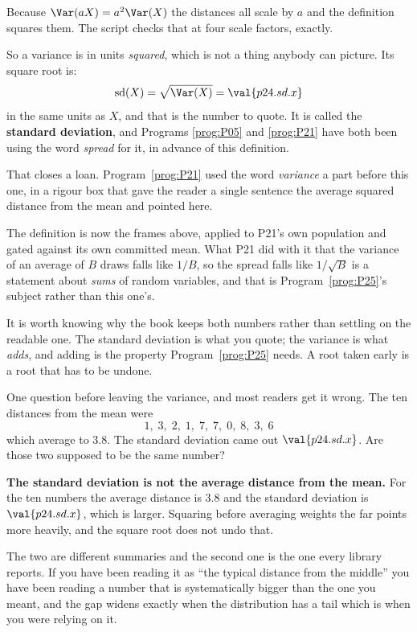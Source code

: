 \begin{fr}

Because $\Var(aX) = a^{2}\Var(X)$ \dash{} the distances all scale by $a$ and
the definition squares them. The script checks that at four scale factors,
exactly.

So a variance is in units \emph{squared}, which is not a thing anybody can
picture. Its square root is:
\[ \operatorname{sd}(X) = \sqrt{\Var(X)} = \val{p24.sd.x} \]
in the same units as $X$, and that is the number to quote. It is called the
\textbf{standard deviation}, and Programs \ref{prog:P05} and \ref{prog:P21}
have both been using the word \emph{spread} for it, in advance of this
definition.
\end{fr}

\begin{fr}
That closes a loan. Program~\ref{prog:P21} used the word \emph{variance} a
part before this one, in a rigour box that gave the reader a single sentence
\dash{} the average squared distance from the mean \dash{} and pointed here.

The definition is now the frames above, applied to P21's own population and
gated against its own committed mean. What P21 did with it \dash{} that the
variance of an average of $B$ draws falls like $1/B$, so the spread falls like
$1/\sqrt{B}$ \dash{} is a statement about \emph{sums} of random variables, and
that is Program~\ref{prog:P25}'s subject rather than this one's.

It is worth knowing why the book keeps both numbers rather than settling on the
readable one. The standard deviation is what you quote; the variance is what
\emph{adds}, and adding is the property Program~\ref{prog:P25} needs. A root
taken early is a root that has to be undone.

One question before leaving the variance, and most readers get it wrong. The
ten distances from the mean were
\[ 1,\; 3,\; 2,\; 1,\; 7,\; 7,\; 0,\; 8,\; 3,\; 6 \]
which average to $\num{3.8}$. The standard deviation came out
$\val{p24.sd.x}$. Are those two supposed to be the same number?
\dotline
\nextframe
\end{fr}

\begin{fr}

\begin{trapbox}
\textbf{The standard deviation is not the average distance from the mean.}
For the ten numbers the average distance is $\num{3.8}$ and the standard
deviation is $\val{p24.sd.x}$, which is larger. Squaring before averaging
weights the far points more heavily, and the square root does not undo that.

The two are different summaries and the second one is the one every library
reports. If you have been reading it as \enquote{the typical distance from the
middle} you have been reading a number that is systematically bigger than the
one you meant, and the gap widens exactly when the distribution has a tail
\dash{} which is when you were relying on it.
\end{trapbox}
\end{fr}

